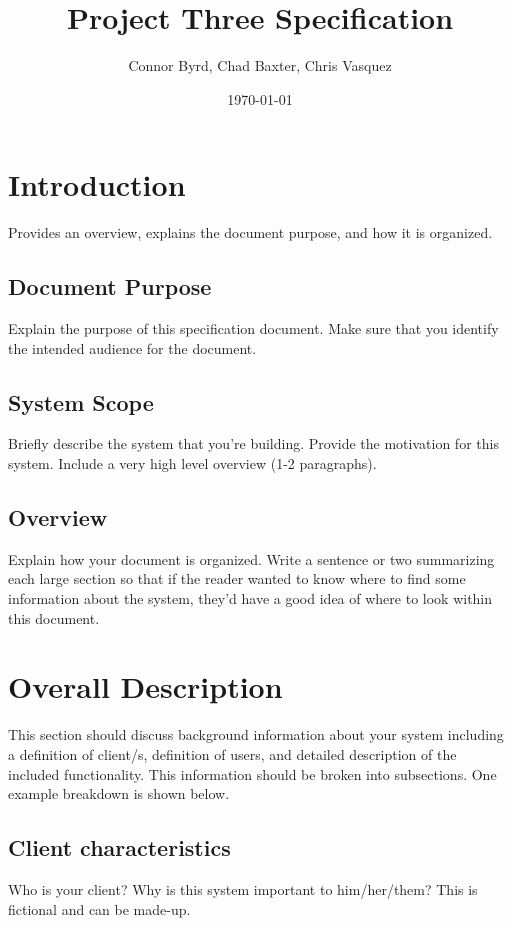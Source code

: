 \documentclass{report}
\begin{document}
\title{Project Three Specification}
\author{Connor Byrd, Chad Baxter, Chris Vasquez}
\date{\today}
\maketitle

\renewcommand\thesection{\arabic{section}}
\renewcommand\thesubsection{\thesection.\arabic{subsection}}
\renewcommand\thesubsubsection{\thesubsection.\arabic{subsubsection}}

\section{Introduction}
Provides an overview, explains the document purpose, and how it is organized.\par
\subsection{Document Purpose}
Explain the purpose of this specification document. Make sure that you identify the intended audience for the document.\par
\subsection{System Scope}
Briefly describe the system that you’re building. Provide the motivation for this system. Include a very high level overview (1-2 paragraphs).\par
\subsection{Overview}
Explain how your document is organized. Write a sentence or two summarizing each large section so that if the reader wanted to know where to find some information about the system, they’d have a good idea of where to look within this document.\par
\section{Overall Description}
This section should discuss background information about your system including a definition of client/s, definition of users, and detailed description of the included functionality. This information should be broken into subsections. One example breakdown is shown below.\par
\subsection{Client characteristics}
Who is your client? Why is this system important to him/her/them? This is fictional and can be made-up.\par
\end{document}
